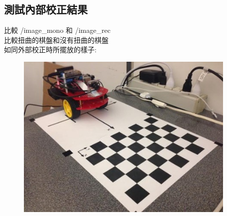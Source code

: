 \documentclass{article}
\begin{document}
\subsection{測試內部校正結果}

比較 /image\_mono 和 /image\_rec
\\比較扭曲的棋盤和沒有扭曲的棋盤
\\如同外部校正時所擺放的樣子:

\begin{figure}[htp]
    \begin{center}
        \includegraphics[width=300pt]{pic/圖片19.jpg}
    \end{center}
\end{figure}
\end{document}
